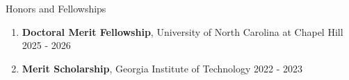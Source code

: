 \documentclass{resume}
\begin{document}



\begin{rSection}{Honors and Fellowships} 
\begin{enumerate}[leftmargin=0.5cm]
\item {\bf Doctoral Merit Fellowship}, {University of North Carolina at Chapel Hill} \hfill 2025 - 2026 \vspace{-0.5em}


\item {\bf Merit Scholarship}, {Georgia Institute of Technology} {\hfill 2022 - 2023} \vspace{-0.5em}


\end{enumerate}
\end{rSection}
\end{document}
